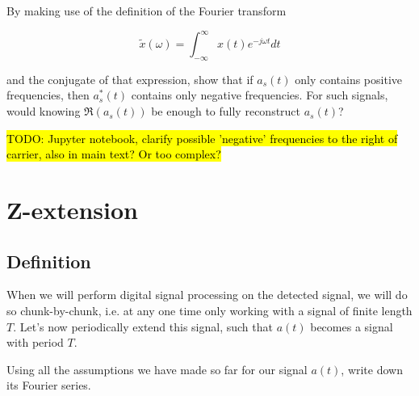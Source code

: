 \pagebreak

\begin{exer}
By making use of the definition of the Fourier transform 

$$\tilde{x}(\omega) = \int_{-\infty}^{\infty}x(t) e^{-j \omega t} dt$$

and the conjugate of that expression, show that if $a_s(t)$ only contains positive frequencies, then $a_s^*(t)$ contains only negative frequencies. For such signals, would knowing $\Re \left(a_s(t) \right)$ be enough to fully reconstruct $a_s(t)$?
\end{exer}

\hl{TODO: Jupyter notebook, clarify possible 'negative' frequencies to the right of carrier, also in main text? Or too complex?}

\pagebreak

\section{Z-extension}

\subsection{Definition}

When we will perform digital signal processing on the detected signal, we will do so chunk-by-chunk, i.e. at any one time only working with a signal of finite length $T$. Let's now periodically extend this signal, such that $a(t)$ becomes a signal with period $T$.

\begin{cue}
Using all the assumptions we have made so far for our signal $a(t)$, write down its Fourier series.
\end{cue}

